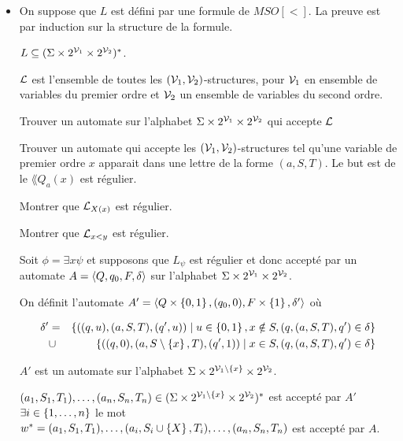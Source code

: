 \begin{proofI}
\begin{itemize}
\begin{itemize}
		      \end{itemize}

		\item \fbox{$\Rightarrow$}

		      On suppose que $L$ est défini par une formule de $MSO[<]$.
		      La preuve est par induction sur la structure de la formule.

		      $L \subseteq (\Sigma \times 2^{\mathcal{V}_1} \times 2 ^ {\mathcal{V}_2})^*$.

		      $\mathcal{L}$ est l'ensemble de toutes les $(\mathcal{V}_1, \mathcal{V}_2)$-structures, pour $\mathcal{V}_1$ en ensemble de variables du premier
		      ordre et $\mathcal{V}_2$ un ensemble de variables du second ordre.

		      \begin{exercice}
			      Trouver un automate sur l'alphabet $\Sigma \times 2^{\mathcal{V}_1} \times 2 ^ {\mathcal{V}_2}$ qui accepte $\mathcal{L}$
		      \end{exercice}

		      \begin{exercice}
			      Trouver un automate qui accepte les $(\mathcal{V}_1, \mathcal{V}_2)$-structures tel qu'une variable de premier ordre $x$ apparait
			      dans une lettre de la forme $(a,S,T)$. Le but est de \mq le $\lang {Q_a(x)}$ est régulier.
		      \end{exercice}

		      \begin{exercice}
			      Montrer que $\mathcal{L}_{X(x)}$ est régulier.
		      \end{exercice}

		      \begin{exercice}
			      Montrer que $\mathcal{L}_{x< y}$ est régulier.
		      \end{exercice}


		      Soit $\phi = \exists x \psi$ et supposons que $L_{\psi}$ est régulier et donc accepté par un automate $A = \langle Q, q_0, F, \delta \rangle$ sur l'alphabet
		      $\Sigma \times 2^{\mathcal{V}_1} \times 2 ^ {\mathcal{V}_2}$.

		      On définit l'automate $A' = \langle Q\times \left\{0,1\right\}, (q_0,0), F \times \left\{1\right\} , \delta' \rangle$ où

		      \begin{eqnarray*}
			      \delta' &=& \left\{((q,u),(a,S,T),(q',u)) \mid u \in \left\{0,1\right\}, x \notin S, (q,(a,S,T),q')\in \delta\right\} \\
			      &\cup& \left\{((q,0),(a,S\setminus \left\{x\right\},T),(q',1)) \mid  x \in S, (q,(a,S,T),q')\in \delta\right\}
		      \end{eqnarray*}


		      $A'$ est un automate sur l'alphabet $\Sigma \times 2^{\mathcal{V}_1\setminus \left\{x\right\}} \times 2 ^ {\mathcal{V}_2}$.

		      $(a_1, S_1, T_1), \ldots, (a_n, S_n, T_n) \in (\Sigma \times 2^{\mathcal{V}_1\setminus \left\{x\right\}} \times 2 ^ {\mathcal{V}_2})^*$ est accepté par $A'$
		      \ssi $\exists i \in \left\{1,\ldots,n\right\}$ \tq le mot $w^* = (a_1, S_1, T_1), \ldots,  (a_i, S_i \cup  \left\{X\right\}, T_i),\ldots,(a_n, S_n, T_n)$ est accepté par $A$.
	\end{itemize}
\end{proofI}
